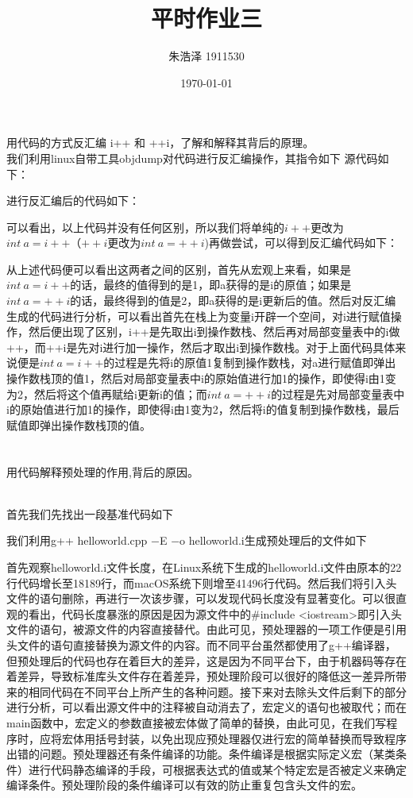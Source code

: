 \documentclass{homework}
\author{朱浩泽 1911530}
\date{\today}
\title{\Large{平时作业三}}
\begin{document}
 \maketitle

\question \large{用代码的方式反汇编 i++ 和 ++i，了解和解释其背后的原理。}
\normalsize
~\\

\noindent 我们利用linux自带工具objdump对代码进行反汇编操作，其指令如下
源代码如下：



进行反汇编后的代码如下：


可以看出，以上代码并没有任何区别，所以我们将单纯的$i++$更改为$int\ a = i++$（$++i$更改为$int\ a = ++i$)再做尝试，可以得到反汇编代码如下：


从上述代码便可以看出这两者之间的区别，首先从宏观上来看，如果是$int\ a = i++$的话，最终的值得到的是1，即a获得的是i的原值；如果是$int\ a = ++i$的话，最终得到的值是2，即a获得的是i更新后的值。然后对反汇编生成的代码进行分析，可以看出首先在栈上为变量i开辟一个空间，对i进行赋值操作，然后便出现了区别，i++是先取出i到操作数栈、然后再对局部变量表中的i做++，而++i是先对i进行加一操作，然后才取出i到操作数栈。对于上面代码具体来说便是$int\ a = i++$的过程是先将i的原值1复制到操作数栈，对a进行赋值即弹出操作数栈顶的值1，然后对局部变量表中i的原始值进行加1的操作，即使得i由1变为2，然后将这个值再赋给i更新i的值；而$int\ a = ++i$的过程是先对局部变量表中i的原始值进行加1的操作，即使得i由1变为2，然后将i的值复制到操作数栈，最后赋值即弹出操作数栈顶的值。
~\\ 
~\\ 
~\\ 

\question \large{用代码解释预处理的作用,背后的原因。}

\normalsize
~\\ 
首先我们先找出一段基准代码如下

我们利用g++ helloworld.cpp −E −o helloworld.i生成预处理后的文件如下

首先观察helloworld.i文件长度，在Linux系统下生成的helloworld.i文件由原本的22行代码增长至18189行，而macOS系统下则增至41496行代码。然后我们将引入头文件的语句删除，再进行一次该步骤，可以发现代码长度没有显著变化。可以很直观的看出，代码长度暴涨的原因是因为源文件中的\#include <iostream>即引入头文件的语句，被源文件的内容直接替代。由此可见，预处理器的一项工作便是引用头文件的语句直接替换为源文件的内容。而不同平台虽然都使用了g++编译器，但预处理后的代码也存在着巨大的差异，这是因为不同平台下，由于机器码等存在着差异，导致标准库头文件存在着差异，预处理阶段可以很好的降低这一差异所带来的相同代码在不同平台上所产生的各种问题。接下来对去除头文件后剩下的部分进行分析，可以看出源文件中的注释被自动消去了，宏定义的语句也被取代；而在main函数中，宏定义的参数直接被宏体做了简单的替换，由此可见，在我们写程序时，应将宏体用括号封装，以免出现应预处理器仅进行宏的简单替换而导致程序出错的问题。预处理器还有条件编译的功能。条件编译是根据实际定义宏（某类条件）进行代码静态编译的手段，可根据表达式的值或某个特定宏是否被定义来确定编译条件。预处理阶段的条件编译可以有效的防止重复包含头文件的宏。
\end{document}
